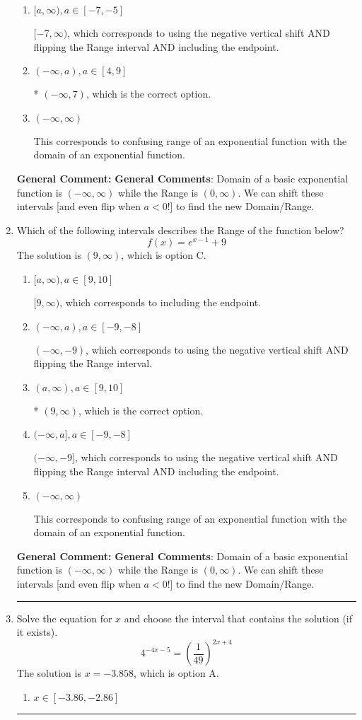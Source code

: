 \documentclass{extbook}[14pt]
\newcommand{\litem}[1]{\item #1

\rule{\textwidth}{0.4pt}}
\begin{document}
\begin{enumerate}
{\begin{enumerate}[label=\Alph*.]
$(-\infty, 7]$, which corresponds to including the endpoint.
\item \( [a, \infty), a \in [-7, -5] \)

$[-7, \infty)$, which corresponds to using the negative vertical shift AND flipping the Range interval AND including the endpoint.
\item \( (-\infty, a), a \in [4, 9] \)

* $(-\infty, 7)$, which is the correct option.
\item \( (-\infty, \infty) \)

This corresponds to confusing range of an exponential function with the domain of an exponential function.
\end{enumerate}

\textbf{General Comment:} \textbf{General Comments}: Domain of a basic exponential function is $(-\infty, \infty)$ while the Range is $(0, \infty)$. We can shift these intervals [and even flip when $a<0$!] to find the new Domain/Range.
}
\litem{
Which of the following intervals describes the Range of the function below?
\[ f(x) = e^{x-1}+9 \]The solution is \( (9, \infty) \), which is option C.\begin{enumerate}[label=\Alph*.]
\item \( [a, \infty), a \in [9, 10] \)

$[9, \infty)$, which corresponds to including the endpoint.
\item \( (-\infty, a), a \in [-9, -8] \)

$(-\infty, -9)$, which corresponds to using the negative vertical shift AND flipping the Range interval.
\item \( (a, \infty), a \in [9, 10] \)

* $(9, \infty)$, which is the correct option.
\item \( (-\infty, a], a \in [-9, -8] \)

$(-\infty, -9]$, which corresponds to using the negative vertical shift AND flipping the Range interval AND including the endpoint.
\item \( (-\infty, \infty) \)

This corresponds to confusing range of an exponential function with the domain of an exponential function.
\end{enumerate}

\textbf{General Comment:} \textbf{General Comments}: Domain of a basic exponential function is $(-\infty, \infty)$ while the Range is $(0, \infty)$. We can shift these intervals [and even flip when $a<0$!] to find the new Domain/Range.
}
\litem{
Solve the equation for $x$ and choose the interval that contains the solution (if it exists).
\[ 4^{-4x-5} = \left(\frac{1}{49}\right)^{2x+4} \]The solution is \( x = -3.858 \), which is option A.\begin{enumerate}[label=\Alph*.]
\item \( x \in [-3.86, -2.86] \)


\end{enumerate}}
\end{enumerate}
\end{document}
